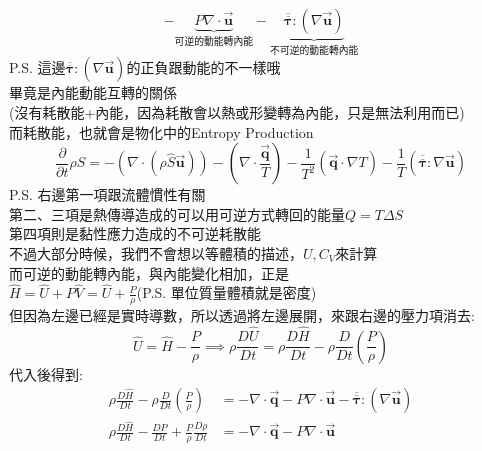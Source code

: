 \documentclass[../main.tex]{subfiles}
\begin{document}
\begin{itemize}
\begin{itemize}
\begin{equation}
{          - \underbrace{P  \nabla \cdot \vec{\bm u}}_{\text{可逆的動能轉內能}} 
          - \underbrace{\overline{\overline{\bm \tau}} : \left(\nabla \vec{\bm u}\right)}_{\text{不可逆的動能轉內能}}}
        \end{equation}
        P.S. 這邊$\overline{\overline{\bm \tau}} : \left(\nabla \vec{\bm u}\right)$的正負跟動能的不一樣哦\\
        畢竟是內能動能互轉的關係\\
        (沒有耗散能+內能，因為耗散會以熱或形變轉為內能，只是無法利用而已)\\
        而耗散能，也就會是物化中的Entropy Production
        \begin{equation}
          \frac{\partial}{\partial t}\rho\hat S= -\left(
            \nabla \cdot (\rho \hat S \vec{\bm u})
          \right) - \left(
            \nabla \cdot \frac{\vec{\bm q}}{T}
          \right) - \frac{1}{T^2}\left(
            \vec{\bm q} \cdot \nabla T
          \right) - \frac{1}{T}\left(
            \overline{\overline{\bm \tau}} : \nabla \vec{\bm u}
          \right)
        \end{equation}
        P.S. 右邊第一項跟流體慣性有關\\
        第二、三項是熱傳導造成的可以用可逆方式轉回的能量$Q=T\Delta S$\\
        第四項則是黏性應力造成的不可逆耗散能\\
        不過大部分時候，我們不會想以等體積的描述，$U, C_V$來計算\\
        而可逆的動能轉內能，與內能變化相加，正是\\
        $\hat H = \hat U + P\hat V = \hat U + \frac{P}{\rho}$(P.S. 單位質量體積就是密度)\\
        但因為左邊已經是實時導數，所以透過將左邊展開，來跟右邊的壓力項消去:
        \begin{equation}
          \hat U = \hat H - \frac{P}{\rho} \implies \rho \frac{D\hat U}{Dt} 
          = \rho \frac{D\hat H}{Dt} - \rho \frac{D}{Dt}\left(\frac{P}{\rho}\right)
        \end{equation}
        代入後得到:
        \begin{align}
          \rho \frac{D\hat H}{Dt} -\rho \frac{D}{Dt}\left(\frac{P}{\rho}\right) &= 
          -\nabla \cdot \vec{\bm q} - P \nabla \cdot \vec{\bm u}
           - \overline{\overline{\bm \tau}} : \left(\nabla \vec{\bm u}\right) \nonumber\\
           \rho \frac{D\hat H}{Dt} -\frac{D P}{Dt} + \frac{P}{\rho}\frac{D \rho}{Dt} &=
           -\nabla \cdot \vec{\bm q} - P \nabla \cdot \vec{\bm u}

\end{align}
\end{itemize}
\end{itemize}
\end{document}
